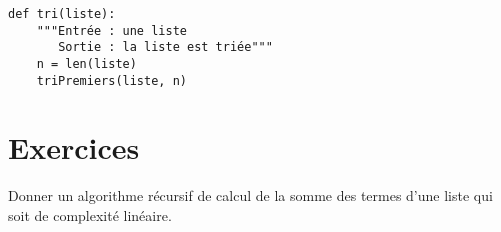 \begin{lstlisting}
def tri(liste):
    """Entrée : une liste 
       Sortie : la liste est triée"""
    n = len(liste)
    triPremiers(liste, n)
\end{lstlisting}
\newpage
\section{Exercices}
\begin{Exercise}[title = {Somme de liste}]
Donner un algorithme récursif de calcul de la somme des termes d'une liste qui soit de complexité linéaire.
\end{Exercise}

